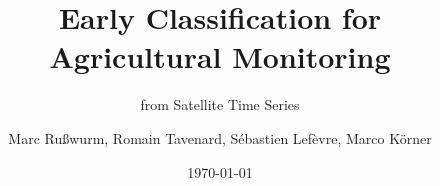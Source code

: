 \documentclass[%
  aspectratio=169,
  9pt,
  USenglish,
]{beamer}
\title{Early Classification for Agricultural Monitoring}
\subtitle{from Satellite Time Series}
\author[M. Rußwurm, R. Tavenard, S. Lefèvre, M.Körner]{Marc Rußwurm, Romain Tavenard, Sébastien Lefèvre, Marco Körner}
\institute[TUM, IRISA-Obelix, LETG-Rennes]{Technical University of Munich, Germany\\
                Remote Sensing Technology}
\date{\today}
\begin{document}
\begin{frame}[t]
  \titlepage
\end{frame}

%		
%				
%				
%		

%	
%
%
\end{document}
